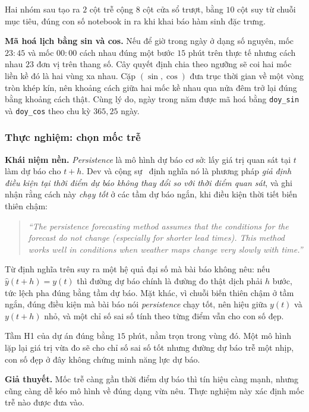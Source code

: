 Hai nhóm sau tạo ra $2$ cột trễ cộng $8$ cột cửa sổ trượt, bằng $10$ cột suy từ chuỗi mục
tiêu, đúng con số notebook in ra khi khai báo hàm sinh đặc trưng.

\textbf{Mã hoá lịch bằng sin và cos.} Nếu để giờ trong ngày ở dạng số nguyên, mốc $23{:}45$
và mốc $00{:}00$ cách nhau đúng một bước $15$ phút trên thực tế nhưng cách nhau $23$ đơn vị
trên thang số. Cây quyết định chia theo ngưỡng sẽ coi hai mốc liền kề đó là hai vùng xa
nhau. Cặp $(\sin, \cos)$ đưa trục thời gian về một vòng tròn khép kín, nên khoảng cách giữa
hai mốc kề nhau qua nửa đêm trở lại đúng bằng khoảng cách thật. Cùng lý do, ngày trong năm
được mã hoá bằng \texttt{doy\_sin} và \texttt{doy\_cos} theo chu kỳ $365{,}25$ ngày.

\subsubsection{Thực nghiệm: chọn mốc trễ}

\textbf{Khái niệm nền.} \textit{Persistence} là mô hình dự báo cơ sở: lấy giá trị quan sát
tại $t$ làm dự báo cho $t+h$. Dev và cộng sự~\cite{dev2018tes} định nghĩa nó là phương pháp
\textit{giả định điều kiện tại thời điểm dự báo không thay đổi so với thời điểm quan sát},
và ghi nhận rằng cách này \textit{chạy tốt} ở các tầm dự báo ngắn, khi điều kiện thời tiết
biến thiên chậm:

\begin{quote}\small
\textit{``The persistence forecasting method assumes that the conditions for the forecast do not change (especially for shorter lead times). This method works well in conditions when weather maps change very slowly with time.''}
\end{quote}


Từ định nghĩa trên suy ra một hệ quả đại số mà bài báo không nêu: nếu $\hat{y}(t+h) = y(t)$
thì đường dự báo chính là đường đo thật dịch phải $h$ bước, tức lệch pha đúng bằng
tầm dự báo. Mặt khác, vì chuỗi biến thiên chậm ở tầm ngắn, đúng điều kiện mà bài báo nói
\textit{persistence} chạy tốt, nên hiệu giữa $y(t)$ và $y(t+h)$ nhỏ, và một chỉ số sai số
tính theo từng điểm vẫn cho con số đẹp.

Tầm H1 của dự án đúng bằng $15$ phút, nằm trọn trong vùng đó. Một mô hình lặp lại giá trị vừa
đo sẽ cho chỉ số sai số tốt nhưng đường dự báo trễ một nhịp, con số đẹp
ở đây không chứng minh năng lực dự báo.

\textbf{Giả thuyết.} Mốc trễ càng gần thời điểm dự báo thì tín hiệu càng mạnh, nhưng cũng
càng dễ kéo mô hình về đúng dạng vừa nêu. Thực nghiệm này xác định mốc trễ nào được đưa vào.

